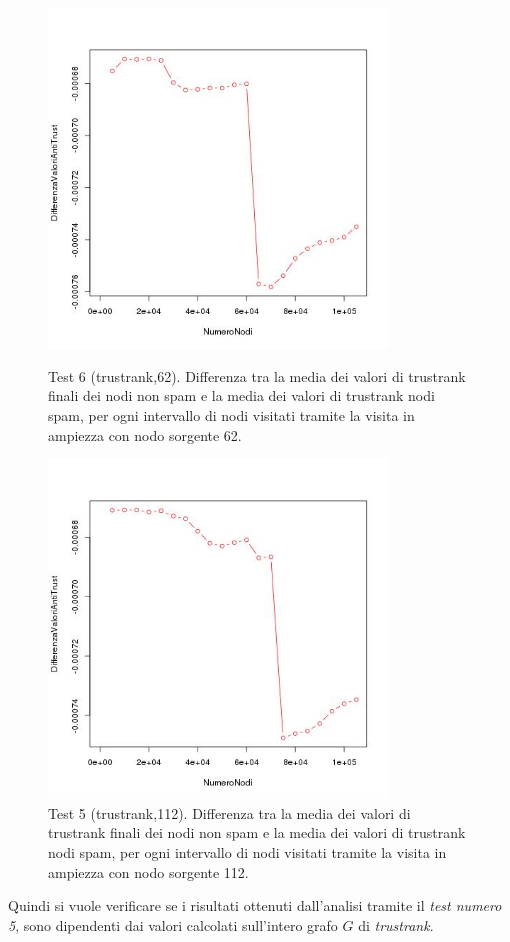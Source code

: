 \begin{figure}
 \centering
 \includegraphics[height=9cm]{immagini/test6/averageCompleteTest_antitrust_62}
  \caption{Test 6 (trustrank,62). Differenza tra la media dei valori di trustrank finali dei nodi non spam e la media dei valori di trustrank nodi spam, per ogni intervallo di nodi visitati tramite la visita in ampiezza con nodo sorgente 62.}
 \label{fig:test6antitrust62}
  \centering
 \includegraphics[height=9cm]{immagini/test6/averageCompleteTest_antitrust_112}
  \caption{Test 5 (trustrank,112). Differenza tra la media dei valori di trustrank finali dei nodi non spam e la media dei valori di trustrank nodi spam, per ogni intervallo di nodi visitati tramite la visita in ampiezza con nodo sorgente 112.}
 \label{fig:test6antitrust112}
\end{figure}

Quindi si vuole verificare se i risultati ottenuti dall'analisi tramite il \textit{test numero 5}, sono dipendenti dai valori calcolati sull'intero grafo \(G\) di \textit{trustrank}.

